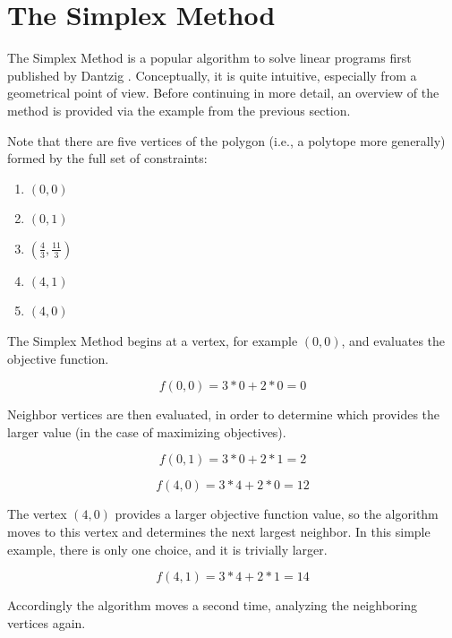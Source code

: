 \section{The Simplex Method}

The Simplex Method is a popular algorithm to solve linear programs first
published by Dantzig \cite{dantzig_maximization_1951}. Conceptually, it is quite
intuitive, especially from a geometrical point of view. Before continuing in
more detail, an overview of the method is provided via the example from the
previous section. 

Note that there are five vertices of the polygon (i.e., a polytope more
generally) formed by the full set of constraints:

\begin{enumerate}
  \item $(0, 0)$
  \item $(0, 1)$
  \item $(\frac{4}{3}, \frac{11}{3})$
  \item $(4, 1)$
  \item $(4, 0)$
\end{enumerate}

The Simplex Method begins at a vertex, for example $(0, 0)$, and evaluates the
objective function.

\begin{equation}
    f(0, 0) = 3 * 0 + 2 * 0 = 0 
\end{equation}

Neighbor vertices are then evaluated, in order to determine which provides the
larger value (in the case of maximizing objectives).

\begin{equation}
    f(0, 1) = 3 * 0 + 2 * 1 = 2 
\end{equation}

\begin{equation}
    f(4, 0) = 3 * 4 + 2 * 0 = 12 
\end{equation}

The vertex $(4, 0)$ provides a larger objective function value, so the algorithm
moves to this vertex and determines the next largest neighbor. In this simple
example, there is only one choice, and it is trivially larger.

\begin{equation}
    f(4, 1) = 3 * 4 + 2 * 1 = 14 
\end{equation}

Accordingly the algorithm moves a second time, analyzing the neighboring
vertices again.

